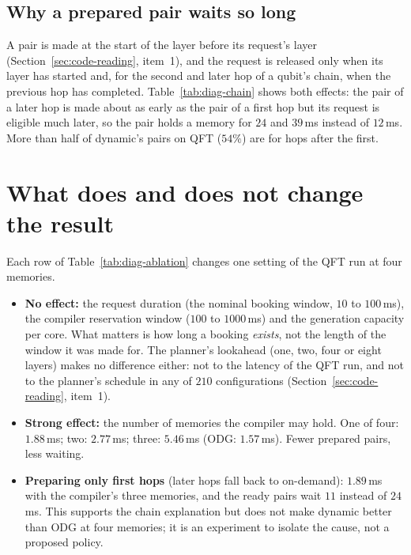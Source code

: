 \subsection{Why a prepared pair waits so long}

A pair is made at the start of the layer before its request's layer (Section~\ref{sec:code-reading}, item~1), and the request is released only when its layer has started
and, for the second and later hop of a qubit's chain, when the previous hop has completed. Table~\ref{tab:diag-chain} shows both effects: the pair of a later hop is made about as early as the pair of a first hop
but its request is eligible much later, so the pair holds a memory for $24$ and $39$\,ms instead of $12$\,ms. More than half of dynamic's pairs on QFT ($54\%$) are for hops after the first.

\section{What does and does not change the result}
\label{sec:ablations}

Each row of Table~\ref{tab:diag-ablation} changes one setting of the QFT run at four memories.
\begin{itemize}
  \item \textbf{No effect:} the request duration (the nominal booking window, $10$ to $100$\,ms), the compiler reservation window ($100$ to $1000$\,ms) and the generation capacity per core.
    What matters is how long a booking \emph{exists}, not the length of the window it was made for. The planner's lookahead (one, two, four or eight layers) makes no difference either: not to the latency of the QFT run, and not to the planner's schedule in any of $210$ configurations (Section~\ref{sec:code-reading}, item~1).
  \item \textbf{Strong effect:} the number of memories the compiler may hold. One of four: $1.88$\,ms; two: $2.77$\,ms; three: $5.46$\,ms (ODG: $1.57$\,ms). Fewer prepared pairs, less waiting.
  \item \textbf{Preparing only first hops} (later hops fall back to on-demand): $1.89$\,ms with the compiler's three memories, and the ready pairs wait $11$ instead of $24$\,ms. This supports the chain explanation
    but does not make dynamic better than ODG at four memories; it is an experiment to isolate the cause, not a proposed policy.
\end{itemize}

